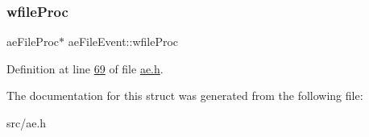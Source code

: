 \mbox{\label{structaeFileEvent_a48ede39c4bcd4c41f2687efac2a05152}} 
\subsubsection{\texorpdfstring{wfile\+Proc}{wfileProc}}
{\footnotesize\ttfamily ae\+File\+Proc$\ast$ ae\+File\+Event\+::wfile\+Proc}



Definition at line \hyperlink{ae_8h_source_l00069}{69} of file \hyperlink{ae_8h_source}{ae.\+h}.



The documentation for this struct was generated from the following file\+:\begin{DoxyCompactItemize}
\item 
src/ae.\+h\end{DoxyCompactItemize}

